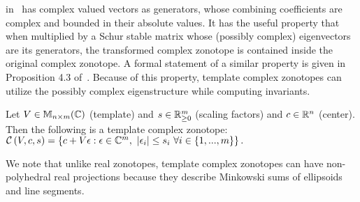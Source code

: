 in~\cite{tcz2017} has complex valued vectors as generators, whose
combining coefficients are complex and bounded in their absolute
values.  It has the useful property that when multiplied by a Schur
stable matrix whose (possibly complex) eigenvectors are its
generators, the transformed complex zonotope is contained inside
the original complex zonotope.  A formal statement of a similar
property is given in Proposition 4.3 of~\cite{adimoolamACC2016}.
Because of this property, template complex zonotopes can utilize the
possibly complex eigenstructure while computing invariants.
%
\begin{definition}
Let $V\in\mathbb{M}_{n\times m}(\mathbb{\mathbb{C}})$ (template) and $s\in\mathbb{R}^m_{\geq 0}$ (scaling factors) and
$c\in\mathbb{R}^n$ (center).  Then the following is a template complex zonotope:
$\mathcal{C}\left(V,c,s\right) =
\left\{c+V\epsilon:\epsilon\in\mathbb{C}^m,~\left|\epsilon_i\right|\leq s_i~\forall
i\in\{1,...,m\}\right\}.$
\end{definition}
%

We note that unlike real zonotopes, template complex zonotopes can
have non-polyhedral real projections because they describe Minkowski
sums of ellipsoids and line segments.
